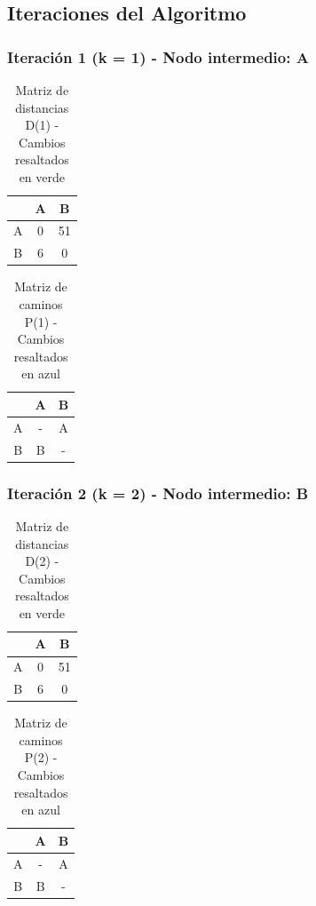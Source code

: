 \documentclass[12pt]{article}
\begin{document}
\clearpage
\subsection{Iteraciones del Algoritmo}
\subsubsection{Iteración 1 (k = 1) - Nodo intermedio: A}
\begin{table}[h!]
\centering
\begin{tabular}{|c|c|c|}
\hline
 & A & B \\\hline
A & 0 & 51 \\\hline
B & 6 & 0 \\\hline
\end{tabular}
\caption{Matriz de distancias D(1) - Cambios resaltados en verde}
\end{table}

\begin{table}[h!]
\centering
\begin{tabular}{|c|c|c|}
\hline
 & A & B \\\hline
A & - & A \\\hline
B & B & - \\\hline
\end{tabular}
\caption{Matriz de caminos P(1) - Cambios resaltados en azul}
\end{table}

\subsubsection{Iteración 2 (k = 2) - Nodo intermedio: B}
\begin{table}[h!]
\centering
\begin{tabular}{|c|c|c|}
\hline
 & A & B \\\hline
A & 0 & 51 \\\hline
B & 6 & 0 \\\hline
\end{tabular}
\caption{Matriz de distancias D(2) - Cambios resaltados en verde}
\end{table}

\begin{table}[h!]
\centering
\begin{tabular}{|c|c|c|}
\hline
 & A & B \\\hline
A & - & A \\\hline
B & B & - \\\hline
\end{tabular}
\caption{Matriz de caminos P(2) - Cambios resaltados en azul}
\end{table}
\end{document}
